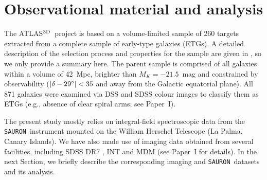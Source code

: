 \documentclass[useAMS,usenatbib,usegraphicx]{mn2e}
\newcommand{\Sauron}{\texttt{SAURON}}
\newcommand{\atlas}{{ATLAS$^{\rm 3D}$}}
\begin{document}
\section{Observational material and analysis} 
\label{sec:obs}

The \atlas\ project is based on a volume-limited sample of 260 targets
extracted from a complete sample of early-type galaxies (ETGs). A detailed
description of the selection process and properties for the sample are given
in \cite[][hereafter Paper~I]{Cappellari+11a}, so we only provide a summary here. The parent sample is
comprised of all galaxies within a volume of 42~Mpc, brighter than $M_K =
-21.5$~mag \citep[2MASS, see][]{Jarrett+00} and 
constrained by observability ($\left|{\delta - 29\hbox{$^\circ$}}\right| < 35$
and away from the Galactic equatorial plane). All 871 galaxies were examined via DSS
and SDSS colour images to classify them as ETGs (e.g., absence of clear spiral arms; see Paper~I).

The present study mostly relies on integral-field spectroscopic data from the
\Sauron\ instrument \citep{Bacon+01} mounted on the William Herschel Telescope (La Palma, Canary Islands).
We have also made use of imaging data obtained from several facilities,
including SDSS DR7 \citep{SDSS+09}, INT and MDM (see Paper~I for details).
In the next Section, we briefly describe the corresponding imaging and \Sauron\
datasets and its analysis.
\end{document}
